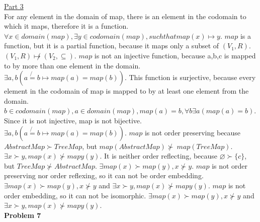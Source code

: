 \documentclass[12pt]{article}
\begin{document}
\noindent\underline{Part 3}\\
For any element in the domain of map, there is an element in the codomain to which it maps, therefore it is a function. $ \forall x \in domain(map), \exists y \in codomain(map), such that map(x)\mapsto y$. $map$ is a function, but it is a partial function, because it maps only a subset of $(V_{1},R)$.  $(V_{1},R)\not \mapsto (V_{2}, \subseteq)$. $map$ is not an injective function, because {a,b,c} is mapped to by more than one element in the domain. $\exists a,b(a\not {{=}}b\mapsto map(a){{=}}map(b))$. This function is surjective, because every element in the codomain of map is mapped to by at least one element from the domain. $b \in codomain(map), a \in domain(map), map(a)=b, \forall b\exists a(map(a){{=}}b)$. Since it is not injective, map is not bijective.  $\exists a,b(a\not {{=}}b\mapsto map(a){{=}}map(b))$. $map$ is not order preserving because $ AbstractMap \succ TreeMap$, but $map(AbstractMap) \not \succ\ map(TreeMap)$. $\exists x \succ y, map(x) \not \succ mapy(y)$. It is neither order reflecting, because $\varnothing \succ \{c\}$, but $TreeMap \not \succ AbstractMap$. $\exists map(x) \succ map(y), x \not \succ y$. $map$ is not order preserving nor order reflexing, so it can not be order embedding. $\exists map(x) \succ map(y), x \not \succ y$ and $\exists x \succ y, map(x) \not \succ mapy(y)$. $map$ is not order embedding, so it can not be isomorphic. $\exists map(x) \succ map(y), x \not \succ y$ and $\exists x \succ y, map(x) \not \succ mapy(y)$.
\\
\noindent \textbf{Problem 7}\\
\end{document}
